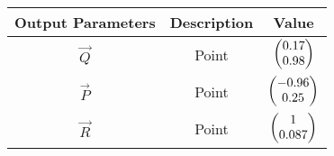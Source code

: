   \begin{tabular}{|c|c|c|}
    \hline
        \textbf{Output Parameters} &\textbf{Description} &\textbf{Value} \\
\hline
          $\vec{Q}$ & Point &$\begin{pmatrix}\-0.17\\0.98\end{pmatrix}$\\
          \hline
          $\vec{P}$ & Point &$\begin{pmatrix}-0.96\\0.25\end{pmatrix}$ \\
         \hline
          $\vec{R}$ & Point &$\begin{pmatrix}1\\0.087\end{pmatrix}$ \\
         \hline
    \end{tabular}
